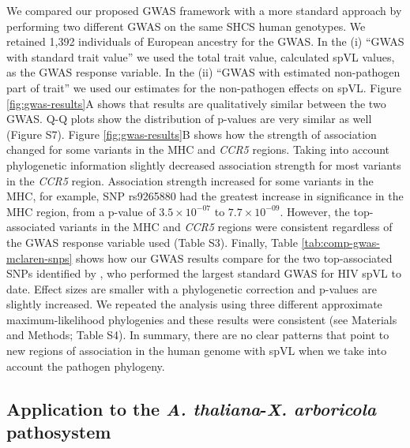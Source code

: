 \documentclass[11pt]{article}
\begin{document}
\begin{linenumbers}
We compared our proposed GWAS framework with a more standard approach by performing two different GWAS on the same SHCS human genotypes. We retained 1,392 individuals of European ancestry for the GWAS. In the (i) ``GWAS with standard trait value'' we used the total trait value, calculated spVL values, as the GWAS response variable. In the (ii) ``GWAS with estimated non-pathogen part of trait'' we used our estimates for the non-pathogen effects on spVL. Figure \ref{fig:gwas-results}A shows that results are qualitatively similar between the two GWAS. Q-Q plots show the distribution of p-values are very similar as well (Figure S7). Figure \ref{fig:gwas-results}B shows how the strength of association changed for some variants in the MHC and \emph{CCR5} regions. Taking into account phylogenetic information slightly decreased association strength for most variants in the \emph{CCR5} region. Association strength increased for some variants in the MHC, for example, SNP rs9265880 had the greatest increase in significance in the MHC region, from a p-value of $3.5 \times 10^{-07}$ to $7.7 \times 10^{-09}$. However, the top-associated variants in the MHC and \emph{CCR5} regions were consistent regardless of the GWAS response variable used (Table S3). Finally, Table \ref{tab:comp-gwas-mclaren-snps} shows how our GWAS results compare for the two top-associated SNPs identified by \citet{McLaren2015}, who performed the largest standard GWAS for HIV spVL to date. Effect sizes are smaller with a phylogenetic correction and p-values are slightly increased. We repeated the analysis using three different approximate maximum-likelihood phylogenies and these results were consistent (see Materials and Methods; Table S4). In summary, there are no clear patterns that point to new regions of association in the human genome with spVL when we take into account the pathogen phylogeny.

\subsection*{Application to the \emph{A. thaliana}-\emph{X. arboricola} pathosystem}


\end{linenumbers}
\end{document}
